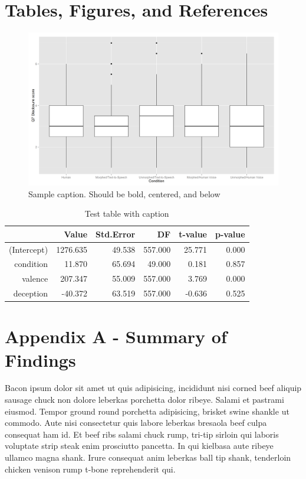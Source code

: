\documentclass{icisdoc}
\begin{document}
\chapter{Tables, Figures, and References}

\begin{figure}[h]
  \centering
  \includegraphics[scale = 0.45]{testimage.png}
  \caption{Sample caption. Should be bold, centered, and below} 
  \label{fig:test}
\end{figure}

\begin{table}[ht]
\centering
\begin{tabular}{rrrrrr}
  \hline
 & Value & Std.Error & DF & t-value & p-value \\ 
  \hline
(Intercept) & 1276.635 & 49.538 & 557.000 & 25.771 & 0.000 \\ 
  condition & 11.870 & 65.694 & 49.000 & 0.181 & 0.857 \\ 
  valence & 207.347 & 55.009 & 557.000 & 3.769 & 0.000 \\ 
  deception & -40.372 & 63.519 & 557.000 & -0.636 & 0.525 \\ 
   \hline
\end{tabular}
\caption{Test table with caption} 
\label{tab:lme-mean}
\end{table}





\chapter{Appendix A - Summary of Findings}
Bacon ipsum dolor sit amet ut quis adipisicing, incididunt nisi corned beef
aliquip sausage chuck non dolore leberkas porchetta dolor ribeye. Salami et
pastrami eiusmod. Tempor ground round porchetta adipisicing, brisket swine
shankle ut commodo. Aute nisi consectetur quis labore leberkas bresaola beef
culpa consequat ham id. Et beef ribs salami chuck rump, tri-tip sirloin qui
laboris voluptate strip steak enim prosciutto pancetta. In qui kielbasa aute
ribeye ullamco magna shank. Irure consequat anim leberkas ball tip shank,
tenderloin chicken venison rump t-bone reprehenderit qui.
\end{document}
